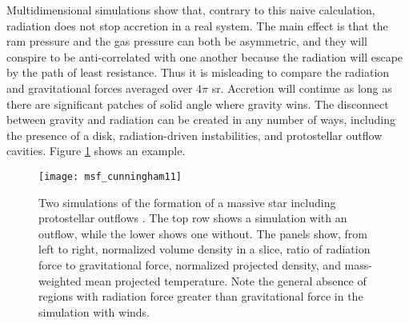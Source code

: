 Multidimensional simulations show that, contrary to this naive calculation, radiation does not stop accretion in a real system. The main effect is that the ram pressure and the gas pressure can both be asymmetric, and they will conspire to be anti-correlated with one another because the radiation will escape by the path of least resistance. Thus it is misleading to compare the radiation and gravitational forces averaged over $4\pi$ sr. Accretion will continue as long as there are significant patches of solid angle where gravity wins. The disconnect between gravity and radiation can be created in any number of ways, including the presence of a disk, radiation-driven instabilities, and protostellar outflow cavities. Figure \ref{fig:msf_cunningham11} shows an example.

\begin{figure}
\texttt{[image: msf\_cunningham11]}
\caption[Simulation of massive star formation with outflows]{
\label{fig:msf_cunningham11}
Two simulations of the formation of a massive star including protostellar outflows \citep{cunningham11a}. The top row shows a simulation with an outflow, while the lower shows one without. The panels show, from left to right, normalized volume density in a slice, ratio of radiation force to gravitational force, normalized projected density, and mass-weighted mean projected temperature. Note the general absence of regions with radiation force greater than gravitational force in the simulation with winds.
}
\end{figure}

